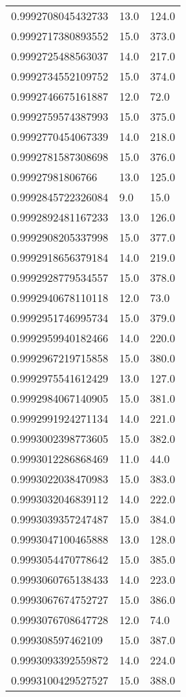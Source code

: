 \begin{center}
\begin{supertabular}[H]{p{0.30\textwidth}p{0.05\textwidth}p{0.05\textwidth}}
0.9992708045432733 & 13.0 & 124.0 \\ 
0.9992717380893552 & 15.0 & 373.0 \\ 
0.9992725488563037 & 14.0 & 217.0 \\ 
0.9992734552109752 & 15.0 & 374.0 \\ 
0.9992746675161887 & 12.0 & 72.0 \\ 
0.9992759574387993 & 15.0 & 375.0 \\ 
0.9992770454067339 & 14.0 & 218.0 \\ 
0.9992781587308698 & 15.0 & 376.0 \\ 
0.99927981806766 & 13.0 & 125.0 \\ 
0.9992845722326084 & 9.0 & 15.0 \\ 
0.9992892481167233 & 13.0 & 126.0 \\ 
0.9992908205337998 & 15.0 & 377.0 \\ 
0.9992918656379184 & 14.0 & 219.0 \\ 
0.9992928779534557 & 15.0 & 378.0 \\ 
0.9992940678110118 & 12.0 & 73.0 \\ 
0.9992951746995734 & 15.0 & 379.0 \\ 
0.9992959940182466 & 14.0 & 220.0 \\ 
0.9992967219715858 & 15.0 & 380.0 \\ 
0.9992975541612429 & 13.0 & 127.0 \\ 
0.9992984067140905 & 15.0 & 381.0 \\ 
0.9992991924271134 & 14.0 & 221.0 \\ 
0.9993002398773605 & 15.0 & 382.0 \\ 
0.9993012286868469 & 11.0 & 44.0 \\ 
0.9993022038470983 & 15.0 & 383.0 \\ 
0.9993032046839112 & 14.0 & 222.0 \\ 
0.9993039357247487 & 15.0 & 384.0 \\ 
0.9993047100465888 & 13.0 & 128.0 \\ 
0.9993054470778642 & 15.0 & 385.0 \\ 
0.9993060765138433 & 14.0 & 223.0 \\ 
0.9993067674752727 & 15.0 & 386.0 \\ 
0.9993076708647728 & 12.0 & 74.0 \\ 
0.999308597462109 & 15.0 & 387.0 \\ 
0.9993093392559872 & 14.0 & 224.0 \\ 
0.9993100429527527 & 15.0 & 388.0 \\ 

\end{supertabular}
\end{center}
